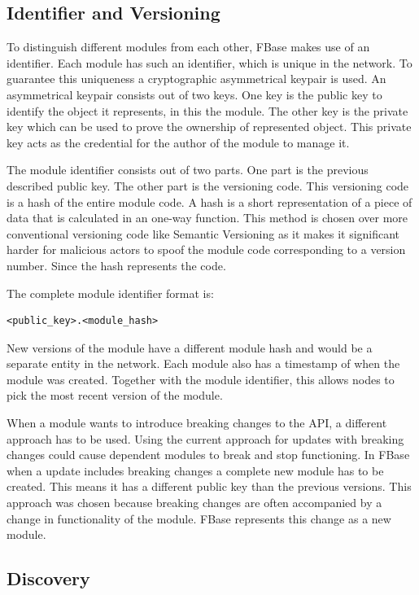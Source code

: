 \subsection{Identifier and Versioning}
To distinguish different modules from each other, FBase makes use of an identifier. Each module has such an identifier, which is unique in the network. To guarantee this uniqueness a cryptographic asymmetrical keypair is used. An asymmetrical keypair consists out of two keys. One key is the public key to identify the object it represents, in this the module. The other key is the private key which can be used to prove the ownership of represented object. This private key acts as the credential for the author of the module to manage it.

The module identifier consists out of two parts. One part is the previous described public key. The other part is the versioning code. This versioning code is a hash of the entire module code. A hash is a short representation of a piece of data that is calculated in an one-way function. This method is chosen over more conventional versioning code like Semantic Versioning as it makes it significant harder for malicious actors to spoof the module code corresponding to a version number. Since the hash represents the code.

The complete module identifier format is:
\begin{verbatim}
<public_key>.<module_hash>
\end{verbatim}

New versions of the module have a different module hash and would be a separate entity in the network. Each module also has a timestamp of when the module was created. Together with the module identifier, this allows nodes to pick the most recent version of the module.

When a module wants to introduce breaking changes to the API, a different approach has to be used. Using the current approach for updates with breaking changes could cause dependent modules to break and stop functioning. In FBase when a update includes breaking changes a complete new module has to be created. This means it has a different public key than the previous versions. This approach was chosen because breaking changes are often accompanied by a change in functionality of the module. FBase represents this change as a new module.

\subsection{Discovery}

